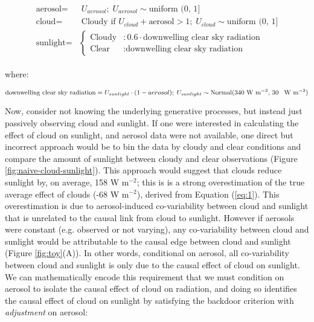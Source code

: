 \documentclass[12pt]{article}
\begin{document}
\begin{align}
  \begin{split}
    \text{aerosol} =& \; U_{aerosol}; \; U_{aerosol} \sim
    \text{uniform (0, 1]}\\ \text{cloud} =& \; \text{Cloudy if } U_{cloud} +
    \text{aerosol} > 1; \; U_{cloud} \sim \text{uniform (0, 1]}\\ \text{sunlight}
    =& \begin{cases} \text{Cloudy} &: 0.6 \cdot \text{downwelling clear
        sky radiation} \\ \text{Clear} &: \text{downwelling clear sky
        radiation}
    \end{cases}
    \label{eq:1}
  \end{split}
\end{align}

where:

\begin{equation*} \text{downwelling clear sky radiation} =
  U_{sunlight} \cdot (1 - aerosol); \; U_{sunlight} \sim
  \text{Normal(340 W m$^{-2}$, 30 \, W m$^{-2}$)}
\end{equation*}

Now, consider not knowing the underlying generative processes, but
instead just passively observing cloud and sunlight. If one were
interested in calculating the effect of cloud on sunlight, and aerosol
data were not available, one direct but incorrect approach would be to bin the data
by cloudy and clear conditions and compare the amount of sunlight
between cloudy and clear observations (Figure
\ref{fig:naive-cloud-sunlight}). This approach would suggest that
clouds reduce sunlight by, on average, 158 W m$^{-2}$; this is is a
strong overestimation of the true average effect of clouds (-68 W
m$^{-2}$), derived from Equation (\ref{eq:1}). This overestimation is
due to aerosol-induced co-variability between cloud and sunlight that
is unrelated to the causal link from cloud to sunlight. However if
aerosols were constant (e.g. observed or not varying), any
co-variability between cloud and sunlight would be attributable to the
causal edge between cloud and sunlight (Figure \ref{fig:toy}(A)). In
other words, conditional on aerosol, all co-variability between cloud
and sunlight is only due to the causal effect of cloud on sunlight.
We can mathematically encode this requirement that we must condition
on aerosol to isolate the causal effect of cloud on radiation, and
doing so identifies the causal effect of cloud on sunlight by
satisfying the backdoor criterion with \textit{adjustment} on aerosol:
\end{document}
